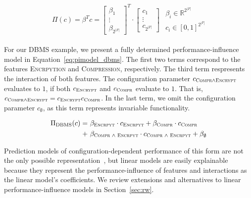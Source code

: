 \documentclass[sigconf]{acmart}
\begin{document}
	\begin{align} \label{eq:pimodel}
	\begin{split}
	\Pi(c) = \beta^T c =  \begin{bmatrix}
	\beta_1\\
	\vdots \\
	\beta_{2^{\vert F\vert}}
	\end{bmatrix}^T \cdot \begin{bmatrix}
	c_1\\
	\vdots \\
	c_{2^{\vert F\vert}}
	\end{bmatrix}
	\end{split}
	\begin{split}
	\beta_i \in \mathbb{R}^{2^{|F|}}\\
	c_i \in \left[0,1\right]^{2^{|F|}}
	\end{split}
	\end{align}
	
	For our DBMS example, we present a fully determined performance-influence model in Equation~\ref{eq:pimodel_dbms}. The first two terms correspond to the features \textsc{Encrpytion} and \textsc{Compression}, respectively. The third term respresents the interaction of both features. The configuration parameter $c_{\textsc{Compr}\land\textsc{Encrypt}}$ evaluates to $1$, if both $c_{\textsc{Encrypt}}$ and $c_{\textsc{Compr}}$ evaluate to $1$.
	That is, $c_{\textsc{Compr}\land\textsc{Encrypt}} = c_{\textsc{Encrypt}}c_{\textsc{Compr}}$. In the last term, we omit the configuration parameter $c_\emptyset$, as this term represents invariable functionality.
	
	\begin{align} \label{eq:pimodel_dbms}
	\begin{split}
	\Pi_{\text{DBMS}}(c) =&~\beta_{\textsc{Encrpyt}} \cdot c_{\textsc{Encrpyt}} + \beta_{\textsc{Compr}} \cdot c_{\textsc{Compr}} \\
	+&~ \beta_{\textsc{Compr\ $\land$\ Encrpyt}} \cdot c_{\textsc{Compr\ $\land$\ Encrpyt}}
	+ \beta_{\emptyset}
	\end{split}
	\end{align}
	
	Prediction models of configuration-dependent performance of this form are not the only possible representation~\cite{guoVariabilityawarePerformancePrediction2013,haDeepPerf2019}, but linear models are easily explainable because they represent the performance-influence of features and interactions as the linear model's coefficients.
	We review extensions and alternatives to linear performance-influence models in Section~\ref{sec:rw}.
	
\end{document}
